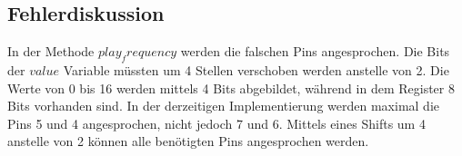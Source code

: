 \subsection{Fehlerdiskussion}
\label{subsec:a5-fehlerdiskussion}

In der Methode $play_frequency$ werden die falschen Pins angesprochen.
Die Bits der $value$ Variable müssten um 4 Stellen verschoben werden anstelle von 2.
Die Werte von 0 bis 16 werden mittels 4 Bits abgebildet, während in dem Register 8 Bits vorhanden sind.
In der derzeitigen Implementierung werden maximal die Pins 5 und 4 angesprochen, nicht jedoch 7 und 6.
Mittels eines Shifts um 4 anstelle von 2 können alle benötigten Pins angesprochen werden.
